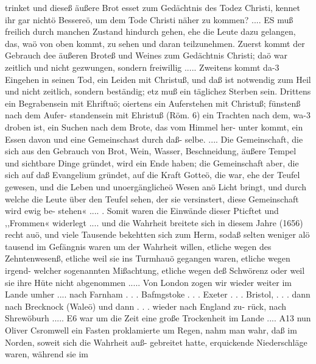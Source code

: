 trinket und dieseß äußere Brot esset zum Gedächtnis des Todez
Christi, kennet ihr gar nichtö Bessereö, um dem Tode Christi näher
zu kommen? ....
ES muß freilich durch manchen Zustand hindurch gehen, ehe
die Leute dazu gelangen, das, waö von oben kommt, zu sehen
und daran teilzunehmen. Zuerst kommt der Gebrauch dee äußeren
Broteß und Weines zum Gedächtnis Christi; daö war zeitlich und
nicht gezwungen, sondern freiwillig ..... Zweitens kommt da-3
Eingehen in seinen Tod, ein Leiden mit Christuß, und daß ist
notwendig zum Heil und nicht zeitlich, sondern beständig; etz muß
ein täglichez Sterben sein. Drittens ein Begrabensein mit Ehriftuö;
oiertens ein Auferstehen mit Christuß; fünstenß nach dem Aufer-
standensein mit Ehristuß (Röm. 6) ein Trachten nach dem, wa-3
droben ist, ein Suchen nach dem Brote, das vom Himmel her-
unter kommt, ein Essen davon und eine Gemeinschast durch daß-
selbe. .... Die Gemeinschaft, die sich aus den Gebrauch von
Brot, Wein, Wasser, Beschneidung, äußere Tempel und sichtbare
Dinge gründet, wird ein Ende haben; die Gemeinschaft aber, die
sich auf daß Evangelium gründet, auf die Kraft Gotteö, die war,
ehe der Teufel gewesen, und die Leben und unoergänglicheö Wesen
anö Licht bringt, und durch welche die Leute über den Teufel
sehen, der sie versinstert, diese Gemeinschaft wird ewig be-
stehen« .... .
Somit waren die Einwände dieser Pticftet und ,,Frommen«
widerlegt .... und die Wahrheit breitete sich in diesem Jahre
(1656) recht auö, und viele Tausende bekehtten sich zum Herm,
sodaß selten weniger alö tausend im Gefängnis waren um der
Wahrheit willen, etliche wegen des Zehntenwesenß, etliche
weil sie ins Turmhauö gegangen waren, etliche wegen irgend-
welcher sogenannten Mißachtung, etliche wegen deß Schwörenz
oder weil sie ihre Hüte nicht abgenommen .....
Von London zogen wir wieder weiter im Lande umher ....
nach Farnham . . . Bafmgstoke . . . Exeter . . . Bristol, . . . dann
nach Brecknock (Waleö) und dann . . . wieder nach England zu-
rück, nach Shrewöburh .....
E6 war um die Zeit eine große Trockenheit im Lande ....
A13 nun Oliver Csromwell ein Fasten proklamierte um Regen,
nahm man wahr, daß im Norden, soweit sich die Wahrheit auß-
gebreitet hatte, erquickende Niederschläge waren, während sie im


